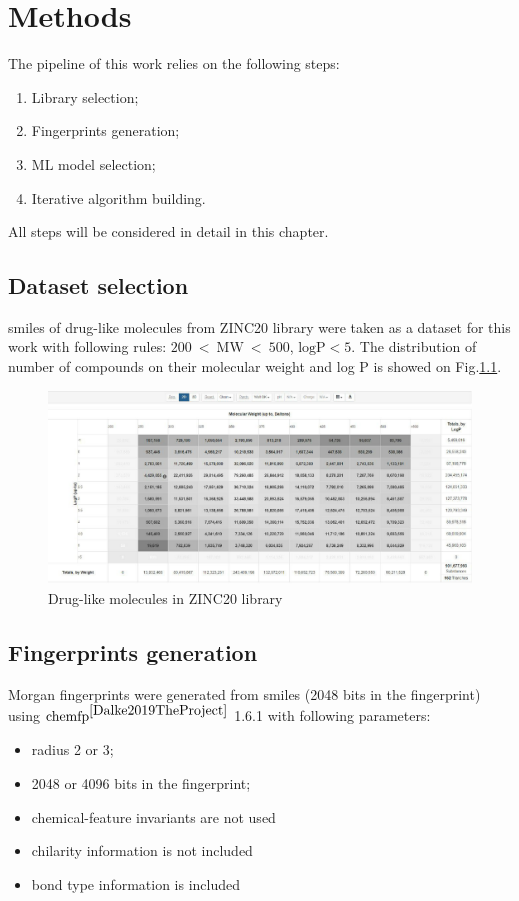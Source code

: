 \chapter{Methods}

The pipeline of this work relies on the following steps:
\begin{enumerate}
    \item Library selection;
    \item Fingerprints generation;
    \item ML model selection;
    \item Iterative algorithm building.
\end{enumerate}
All steps will be considered in detail in this chapter.
\section{Dataset selection}

\acrshort{smiles} of drug-like molecules from ZINC20 library were taken as a dataset for this work with following rules: $200\ <\ \text{MW}\ <\ 500$, $\text{logP} < 5$.
The distribution of number of compounds on their molecular weight and log P is showed 
on  Fig.\ref{zinc}.

\begin{figure}[H]
    \centering
    \includegraphics[scale=0.35]{Images/zinc.jpg}
    \caption{Drug-like molecules in ZINC20 library}
   \label{zinc}
\end{figure}

\section{Fingerprints generation}

Morgan fingerprints were generated from \acrshort{smiles} (2048 bits in the fingerprint) 
using $\text{chemfp}^{\cite{Dalke2019TheProject}}$ 1.6.1 with following parameters:
\begin{itemize}
    \item radius 2 or 3;
    \item 2048 or 4096 bits in the fingerprint;
    \item chemical-feature invariants are not used
    \item chilarity information is not included
    \item bond type information is included
\end{itemize}

